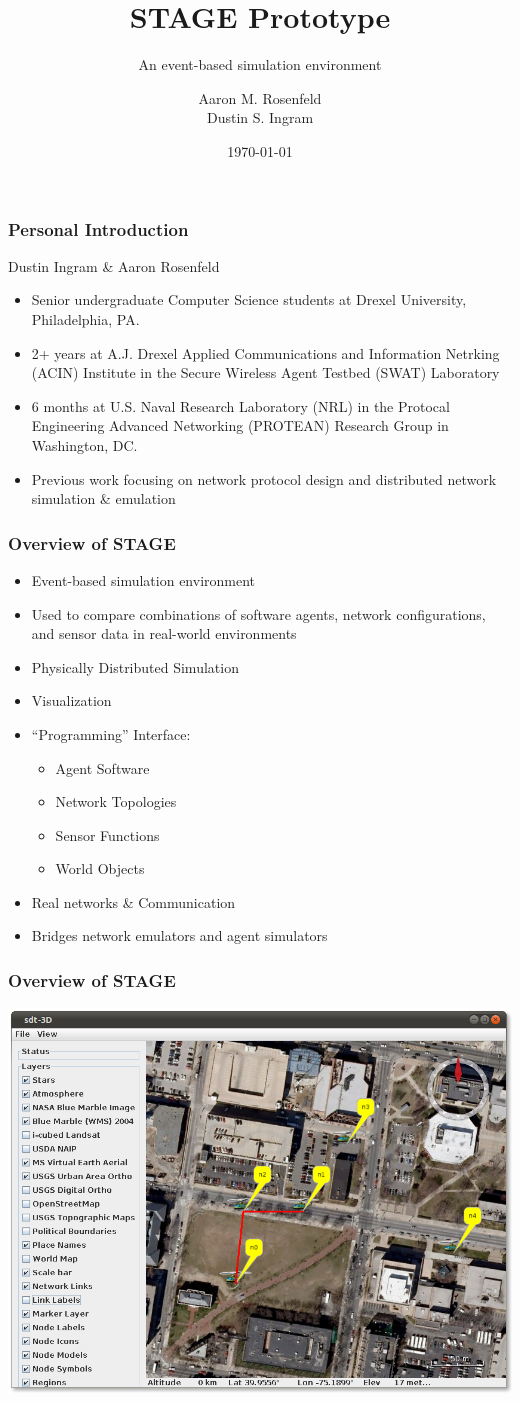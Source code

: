 \documentclass[mathserif]{beamer}
\title{STAGE Prototype}
\subtitle{An event-based simulation environment}
\author{Aaron M. Rosenfeld \\ Dustin S. Ingram}
\date{\today}
\begin{document}
\frame{\titlepage}

\frame
{
    \frametitle{Personal Introduction}
    Dustin Ingram \& Aaron Rosenfeld
    \begin{itemize}
	\item Senior undergraduate Computer Science students at Drexel University, Philadelphia, PA.
	\item 2+ years at A.J. Drexel Applied Communications and Information Netrking (ACIN) Institute in the Secure Wireless Agent Testbed (SWAT) Laboratory
	\item 6 months at U.S. Naval Research Laboratory (NRL) in the Protocal Engineering Advanced Networking (PROTEAN) Research Group in Washington, DC.
	\item Previous work focusing on network protocol design and distributed network simulation \& emulation
    \end{itemize}
}

\frame
{
    \frametitle{Overview of STAGE}
    \begin{itemize}
	\item Event-based simulation environment
	\item Used to compare combinations of software agents, network configurations, and sensor data in real-world environments
	\item Physically Distributed Simulation
	\item Visualization
	\item ``Programming'' Interface:
	\begin{itemize}
	    \item Agent Software
	    \item Network Topologies
	    \item Sensor Functions
	    \item World Objects
	\end{itemize}
	\item Real networks \& Communication
	\item Bridges network emulators and agent simulators
    \end{itemize}
}

\frame
{
    \frametitle{Overview of STAGE}
    \begin{center}
        \includegraphics[scale=.3]{ss2.png}
    \end{center}
}
\end{document}
